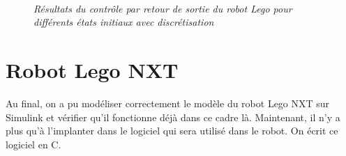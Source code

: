 \documentclass[11pt,french]{article} %
\begin{document}
\begin{figure}[H]%
	\centering
	\noindent{} \\
		\captionsetup{justification=centering}
		\caption{\textit{Résultats du contrôle par retour de sortie du robot Lego pour différents états initiaux avec discrétisation}}
		\label{fig:robot_discret}%
\end{figure}
\vspace{0.5cm}


\newpage
\section{Robot Lego NXT}

\quad Au final, on a pu modéliser correctement le modèle du robot Lego NXT sur Simulink et vérifier qu'il fonctionne déjà dans ce cadre là. Maintenant, il n'y a plus qu'à l'implanter dans le logiciel qui sera utilisé dans le robot. On écrit ce logiciel en C. \\
\end{document}
